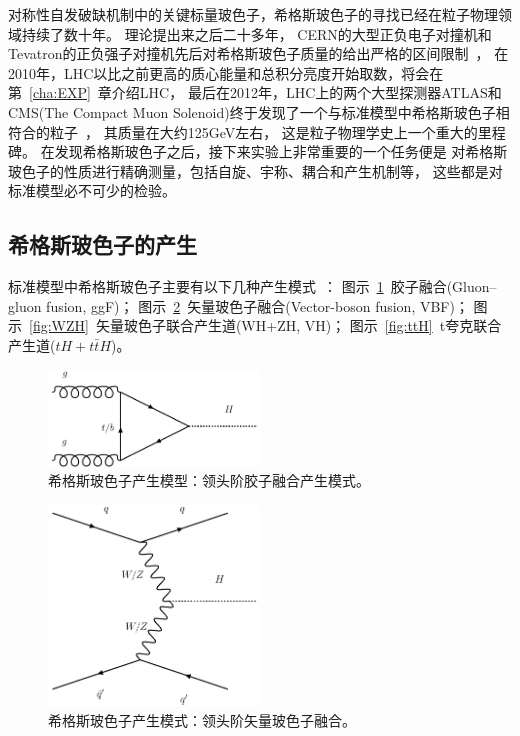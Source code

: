 对称性自发破缺机制中的关键标量玻色子，希格斯玻色子的寻找已经在粒子物理领域持续了数十年。
理论提出来之后二十多年，
CERN的大型正负电子对撞机和Tevatron的正负强子对撞机先后对希格斯玻色子质量的给出严格的区间限制~\cite{TEVN,LEP}，
在2010年，LHC以比之前更高的质心能量和总积分亮度开始取数，将会在第~\ref{cha:EXP}~章介绍LHC，
最后在2012年，LHC上的两个大型探测器ATLAS和CMS(The Compact Muon Solenoid)终于发现了一个与标准模型中希格斯玻色子相符合的粒子~\cite{ATLASHIGGS,CMSHIGGS}，
其质量在大约125GeV左右，
这是粒子物理学史上一个重大的里程碑。
在发现希格斯玻色子之后，接下来实验上非常重要的一个任务便是
对希格斯玻色子的性质进行精确测量，包括自旋、宇称、耦合和产生机制等，
这些都是对标准模型必不可少的检验。

\subsection{希格斯玻色子的产生}
\label{sec:HiggsPD}

标准模型中希格斯玻色子主要有以下几种产生模式~\cite{HANDHIGGS}：
图示~\ref{fig:ggF}~胶子融合(Gluon–gluon fusion, ggF)；
图示~\ref{fig:VBF}~矢量玻色子融合(Vector-boson fusion, VBF)；
图示~\ref{fig:WZH}~矢量玻色子联合产生道(WH+ZH, VH)；
图示~\ref{fig:ttH}~t夸克联合产生道($tH+t\bar{t}H$)。

\begin{figure}
  \begin{center}
    \includegraphics[width=0.5\textwidth]{figuresTHE/ggF.pdf}
  \end{center}
  \caption{
希格斯玻色子产生模型：领头阶胶子融合产生模式。
}
    \label{fig:ggF}
\end{figure}

\begin{figure}
  \begin{center}
    \includegraphics[width=0.5\textwidth]{figuresTHE/VBF.pdf}
  \end{center}
  \caption{
希格斯玻色子产生模式：领头阶矢量玻色子融合。
}
    \label{fig:VBF}
\end{figure}


